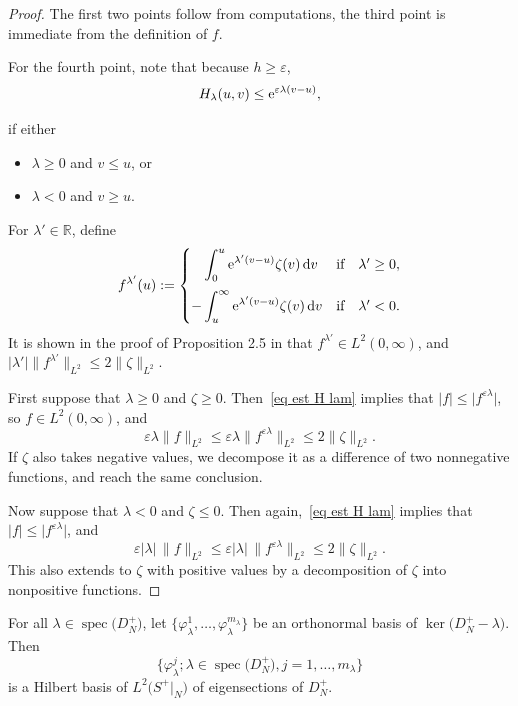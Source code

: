 \documentclass[10pt,a4paper]{amsart}
\numberwithin{equation}{section}
\DeclareMathOperator{\spec}{spec}
\newcommand{\R}{\mathbb{R}}
\begin{document}
\begin{proof}
The first two points follow from computations, the third point is immediate from the definition of $f$.

For the fourth point, note that because $h \geq \varepsilon$,
\begin{equation} \label{eq est H lam}
H_{\lambda}(u, v) \leq {\rm e}^{\varepsilon \lambda(v-u)},
\end{equation}
{\samepage if either
\begin{itemize}\itemsep=0pt
\item $\lambda \geq 0$ and $v \leq u$, or
\item $\lambda<0$ and $v \geq u$.
\end{itemize}}
For $\lambda' \in \R$, define
\[
f^{\lambda'}(u) :=
\begin{cases}
\displaystyle\phantom{-}\int_0^u {\rm e}^{\lambda'(v-u)} \zeta(v)\, {\rm d}v & \text{if\quad $\lambda' \geq 0$},
\\[4mm]
\displaystyle-\int_u^{\infty} {\rm e}^{\lambda'(v-u)}\zeta(v)\, {\rm d}v & \text{if\quad $\lambda' <0$}.
\end{cases}
\]
 It is shown in the proof of Proposition 2.5 in \cite{APS1} that $f^{\lambda'} \in L^2(0,\infty)$, and $|\lambda'|\|f^{\lambda'}\|_{L^2}\leq 2\|\zeta\|_{L^2}$.

First suppose that $\lambda \geq 0$ and $\zeta \geq 0$.
Then~\eqref{eq est H lam} implies that $|f| \leq \big|f^{\varepsilon \lambda}\big|$, so $f\in L^2(0,\infty)$, and
\[
\varepsilon \lambda \|f\|_{L^2} \leq \varepsilon \lambda \big\|f^{\varepsilon \lambda}\big\|_{L^2} \leq 2\|\zeta\|_{L^2}.
\]
If $\zeta$ also takes negative values, we decompose it as a difference of two nonnegative functions, and reach the same conclusion.

Now suppose that $\lambda < 0$ and $\zeta \leq 0$. Then again,~\eqref{eq est H lam} implies that $|f| \leq \big|f^{\varepsilon \lambda}\big|$, and
\[
\varepsilon |\lambda|\, \|f\|_{L^2} \leq \varepsilon |\lambda|\, \big\|f^{\varepsilon \lambda}\big\|_{L^2} \leq 2\|\zeta\|_{L^2}.
\]
This also extends to $\zeta$ with positive values by a decomposition of $\zeta$ into nonpositive functions.
\end{proof}

For all $\lambda \in \spec\big(D_N^+\big)$, let $\big\{\varphi_{\lambda}^1, \dots, \varphi_{\lambda}^{m_{\lambda}} \big\}$ be an orthonormal basis of $\ker\big(D_N^+ - \lambda\big)$. Then
\begin{equation} \label{eq basis phi lam}
 \big\{\varphi_{\lambda}^j; {\lambda \in \spec\big(D_N^+\big)}, j=1, \dots, m_{\lambda} \big\}
 \end{equation}
 is a Hilbert basis of $L^2\big(S^+|_N\big)$ of eigensections of $D_N^+$.
\end{document}
